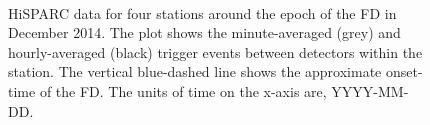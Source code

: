 \begin{figure}[ht!]
	\centering
	 \\
	
	\qquad
	
	
	\caption{HiSPARC data for four stations around the epoch of the FD in December 2014. The plot shows the minute-averaged (grey) and hourly-averaged (black) trigger events between detectors within the station. The vertical blue-dashed line shows the approximate onset-time of the FD. The units of time on the x-axis are, YYYY-MM-DD.}
	\label{fig:FD_201412}
\end{figure}


